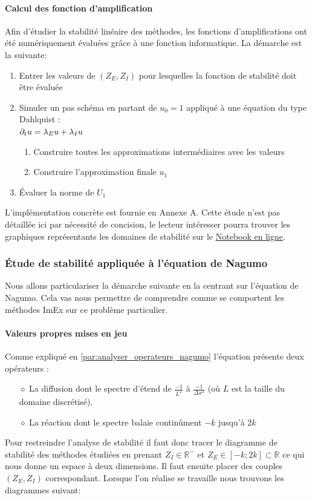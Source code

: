     \paragraph{Calcul des fonction d'amplification }
    Afin d'étudier la stabilité linéaire des méthodes, les fonctions d'amplifications ont été numériquement évaluées grâce à une fonction informatique. 
    La démarche est la suivante:
    \begin{enumerate}
        \item Entrer les valeurs de $(Z_E,Z_I)$ pour lesquelles la fonction de stabilité doit être évaluée
        \item Simuler un pas schéma en partant de $u_0 = 1$ appliqué à une équation du type Dahlquist :\\$\partial_t u = \lambda_E u + \lambda_I u$
        \begin{enumerate}
            \item Construire toutes les approximations intermédiaires avec les valeurs 
            \item Construire l'approximation finale $u_1$
        \end{enumerate}
        \item Évaluer la norme de $U_1$
    \end{enumerate}
    L'implémentation concrète est fournie en Annexe A. Cette étude n'est pas détaillée ici par nécessité de concision,
    le lecteur intéresser pourra trouver les graphiques représentants les domaines de stabilité sur le \href{https://github.com/Ocelot-Pale/ImEx_stability_Nagumo}{Notebook en ligne}.


\subsubsection{Étude de stabilité appliquée à l'équation de Nagumo}
    Nous allons particulariser la démarche suivante en la centrant sur l'équation de Nagumo. Cela vas nous permettre de comprendre 
    comme se comportent les méthodes ImEx sur ce problème particulier.
    \paragraph{Valeurs propres mises en jeu}
        Comme expliqué en \ref{par:analyser_operateurs_nagumo} l'équation présente deux opérateurs : 
        \begin{itemize}
            \item[$\diamond$] La diffusion dont le spectre d'étend de $\frac{-1}{L^2}$ à $\frac{-1}{\Delta x^2}$ (où $L$ est la taille du domaine discrétisé).
            \item[$\diamond$] La réaction dont le spectre balaie continûment $-k$ jusqu'à $2k$
        \end{itemize}
        Pour restreindre l'analyse de stabilité il faut donc tracer le diagramme de stabilité des méthodes étudiées en prenant $Z_I \in \mathbb{R}^-$ 
        et $Z_E \in [-k;2k] \subset \mathbb{R}$ ce qui nous donne un espace à deux dimensions. Il faut ensuite placer des couples $(Z_E,Z_I)$ correspondant.
        Lorsque l'on réalise se travaille nous trouvons les diagrammes suivant: 
